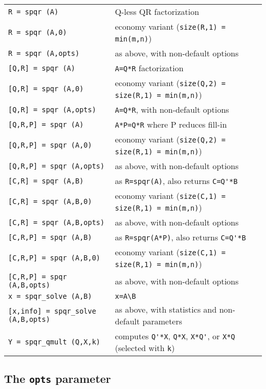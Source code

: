 \documentclass[12pt]{article}
\begin{document}
{\footnotesize
\begin{tabular}{|ll|}
\hline
\verb'R = spqr (A)'             & Q-less QR factorization \\
\verb'R = spqr (A,0)'           & economy variant (\verb'size(R,1) = min(m,n)') \\
\verb'R = spqr (A,opts)'        & as above, with non-default options \\
\hline
\verb'[Q,R] = spqr (A)'         & \verb'A=Q*R' factorization \\
\verb'[Q,R] = spqr (A,0)'       & economy variant (\verb'size(Q,2) = size(R,1) = min(m,n)') \\
\verb'[Q,R] = spqr (A,opts)'    & \verb'A=Q*R', with non-default options \\
\hline
\verb'[Q,R,P] = spqr (A)'       & \verb'A*P=Q*R' where P reduces fill-in \\
\verb'[Q,R,P] = spqr (A,0)'     & economy variant (\verb'size(Q,2) = size(R,1) = min(m,n)') \\
\verb'[Q,R,P] = spqr (A,opts)'  & as above, with non-default options \\
\hline
\verb'[C,R] = spqr (A,B)'       & as \verb'R=spqr(A)', also returns \verb"C=Q'*B" \\
\verb'[C,R] = spqr (A,B,0)'     & economy variant (\verb'size(C,1) = size(R,1) = min(m,n)') \\
\verb'[C,R] = spqr (A,B,opts)'  & as above, with non-default options \\
\hline
\verb'[C,R,P] = spqr (A,B)'     & as \verb'R=spqr(A*P)', also returns \verb"C=Q'*B" \\
\verb'[C,R,P] = spqr (A,B,0)'   & economy variant (\verb'size(C,1) = size(R,1) = min(m,n)') \\
\verb'[C,R,P] = spqr (A,B,opts)'& as above, with non-default options \\
\hline
\verb'x = spqr_solve (A,B)'     & \verb'x=A\B' \\
\verb'[x,info] = spqr_solve (A,B,opts)' & as above, with statistics and non-default parameters \\
\hline
\verb'Y = spqr_qmult (Q,X,k)'   & computes \verb"Q'*X", \verb"Q*X", \verb"X*Q'", or \verb"X*Q" 
(selected with \verb'k') \\
\hline
\end{tabular}
}

\subsection{The {\tt opts} parameter}
\end{document}
